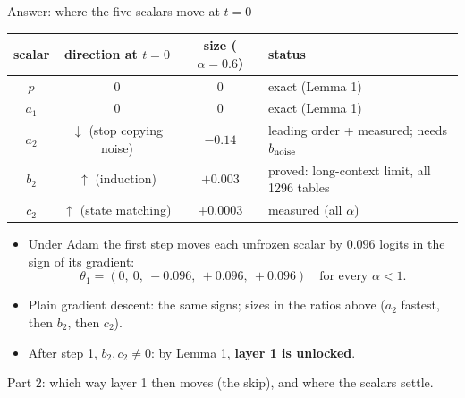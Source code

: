 \begin{frame}{Answer: where the five scalars move at $t=0$}
\small
\begin{center}
\begin{tabular}{cccl}\toprule
scalar & direction at $t=0$ & size ($\alpha=0.6$) & status\\\midrule
$p$ & $0$ & $0$ & exact (Lemma 1)\\
$a_1$ & $0$ & $0$ & exact (Lemma 1)\\
$a_2$ & $\downarrow$ (stop copying noise) & $-0.14$ & leading order + measured; needs $b_{\rm noise}$\\
$b_2$ & $\uparrow$ (induction) & $+0.003$ & proved: long-context limit, all 1296 tables\\
$c_2$ & $\uparrow$ (state matching) & $+0.0003$ & measured (all $\alpha$)\\\bottomrule
\end{tabular}
\end{center}
\vspace{0.3em}
\begin{itemize}
\item Under Adam the first step moves each unfrozen scalar by $0.096$ logits in the sign of its gradient:
\[
\theta_1=(0,\ 0,\ -0.096,\ +0.096,\ +0.096)\quad\text{for every }\alpha<1 .
\]
\item Plain gradient descent: the same signs; sizes in the ratios above ($a_2$ fastest, then $b_2$, then $c_2$).
\item After step 1, $b_2,c_2\neq0$: by Lemma 1, \textbf{layer 1 is unlocked}.
\end{itemize}
\vspace{0.2em}
{\footnotesize\color{gray}Part 2: which way layer 1 then moves (the skip), and where the scalars settle.}
\end{frame}

